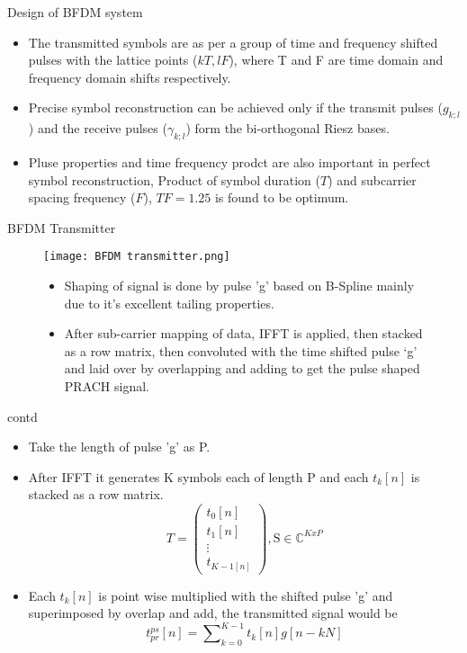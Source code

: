 \documentclass{beamer}
\begin{document}
\begin{frame}{Design of BFDM system}
    \begin{itemize}
        \item The transmitted symbols are as per a group of time and frequency shifted pulses with the lattice points ($kT,lF$), where T and F are time domain and frequency domain shifts respectively.
        \item  Precise symbol reconstruction can be achieved only if the transmit pulses ($g_{k;l}$) and the receive pulses ($\gamma_{k;l}$) form the bi-orthogonal Riesz bases.
        \item Pluse properties and time frequency prodct are also important in perfect symbol reconstruction, Product of symbol duration ($T$) and subcarrier spacing frequency ($F$), $TF=1.25$ is found to be optimum.
    \end{itemize}
\end{frame}
\begin{frame}{BFDM Transmitter}
      \begin{figure}[ht]
    \texttt{[image: BFDM transmitter.png]}
    \label{BFDM transmitter}
    \begin{itemize}
        \item Shaping of signal is done by pulse 'g' based on B-Spline mainly due to it's excellent tailing properties.
        \item After sub-carrier mapping of data, IFFT is applied, then  stacked as a row matrix, then convoluted with the time shifted pulse ‘g’ and laid over by overlapping and adding to get the pulse shaped PRACH signal.  
    \end{itemize}
\end{figure}
\end{frame}
\begin{frame}{contd}
\begin{itemize}
    \item Take the length of pulse 'g' as P.
    \item After IFFT it generates K symbols each of length P and each $t_k[n]$ is stacked as a row matrix.\\
    \begin{equation*}T = \left( \begin{array}{c} {{t_0}[n]} \\ {{t_1}[n]} \\ \vdots \\ {{t_{K - 1[n]}}} \end{array} \right),{\text{S}} \in {\mathbb{C}^{KxP}}\tag{1}\end{equation*}
    \item Each $t_k[n]$ is point wise multiplied with the shifted pulse 'g' and superimposed by overlap and add, the transmitted signal would be\\
    \begin{equation*}t_{pr}^{ps}[n] = \sum\nolimits_{k = 0}^{K - 1} {{t_k}[n]g[n - kN]} \tag{2}\end{equation*}
\end{itemize}
\end{frame}
\end{document}
